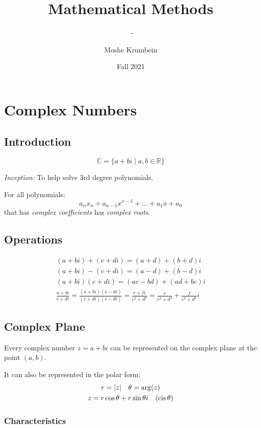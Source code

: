 \documentclass[00_complete]{subfiles}
\title{Mathematical Methods}
\author{Moshe Krumbein}
\date{Fall 2021}
\begin{document}
\setcounter{chapter}{2}

\chapter{Complex Numbers}
\subtitle{\theauthor~- \thedate}

\section{Introduction}

\[
\mathbb{C} = \{a +bi \mid a, b \in \mathbb{R}\}
\]

\emph{Inception:} To help solve 3rd degree polynomials.

\begin{definition}
For all polynomials:
$$a_nx_n+a_{a-1}x^{x-1}+\ldots+a_1x+a_0$$
that has \emph{complex coefficients} has \emph{complex roots}.
\end{definition}

\section{Operations}

\begin{gather}
    (a+bi)+(c+di) = (a+d)+(b+d)i \\
    (a+bi)-(c+di) = (a-d)+(b-d)i \\
    (a+bi)(c+di) = (ac - bd) + (ad + bc)i \\
    \frac{a+bi}{c+di} = \frac{(a+bi)(c-di)}{(c+di)(c-di)}
    = \frac{e+fi}{c^2+d^2} = \frac{e}{c^2+d^2}+\frac{f}{c^2+d^2}i
\end{gather}

\section{Complex Plane}

Every complex number \(z=a+bi\) can be represented on the complex plane
at the point \((a,b)\).

It can also be represented in the polar form: \[
\begin{gathered}
    r=|z| \quad \theta = \arg(z) \\
    z = r \cos \theta + r \sin \theta i \quad (\operatorname{cis} \theta)\\
\end{gathered}
\]

\subsection{Characteristics}
\end{document}
